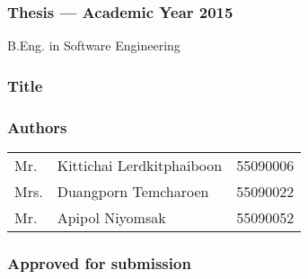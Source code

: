 \thispagestyle{empty}

\begin{flushleft}
\subsubsection{\Large{Thesis --- Academic Year 2015}}
B.Eng. in Software Engineering \kmitl

\vspace{2cm}

\subsubsection{\Large{Title}}
\dms

\vspace{1cm}
\subsubsection{\Large{Authors}}
\begin{tabular}{lll}
Mr. & Kittichai Lerdkitphaiboon & 55090006 \\
Mrs. & Duangporn Temcharoen & 55090022 \\
Mr. & Apipol Niyomsak & 55090052
\end{tabular}
\end{flushleft}

\vfill

\begin{flushright}
\subsubsection{\Large{Approved for submission}}
\vspace{1cm}
\vspace{1cm}
 \\
\vspace{1cm}
 \\
\end{flushright}